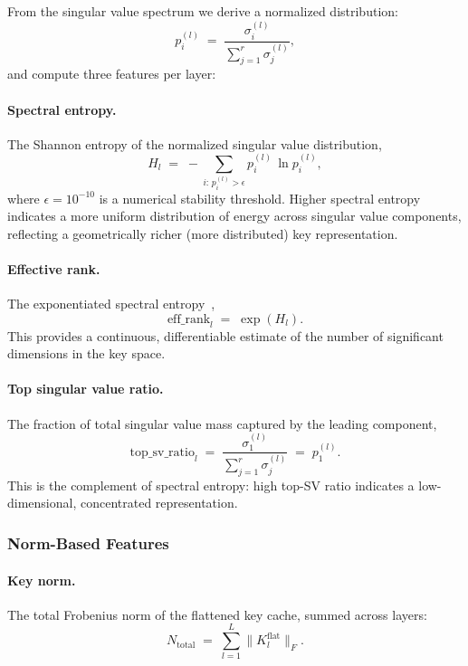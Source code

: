 From the singular value spectrum we derive a normalized distribution:
\begin{equation}
  p_i^{(l)} \;=\; \frac{\sigma_i^{(l)}}{\sum_{j=1}^{r} \sigma_j^{(l)}},
  \label{eq:pnorm}
\end{equation}
and compute three features per layer:

\paragraph{Spectral entropy.}
The Shannon entropy of the normalized singular value distribution,
\begin{equation}
  H_l \;=\; -\sum_{i:\, p_i^{(l)} > \epsilon} p_i^{(l)} \,\ln p_i^{(l)},
  \label{eq:spectral-entropy}
\end{equation}
where $\epsilon = 10^{-10}$ is a numerical stability threshold.
Higher spectral entropy indicates a more uniform distribution of energy across singular value components, reflecting a geometrically richer (more distributed) key representation.

\paragraph{Effective rank.}
The exponentiated spectral entropy~\cite{roy2007effective},
\begin{equation}
  \mathrm{eff\_rank}_l \;=\; \exp(H_l).
  \label{eq:eff-rank}
\end{equation}
This provides a continuous, differentiable estimate of the number of significant dimensions in the key space.

\paragraph{Top singular value ratio.}
The fraction of total singular value mass captured by the leading component,
\begin{equation}
  \mathrm{top\_sv\_ratio}_l \;=\; \frac{\sigma_1^{(l)}}{\sum_{j=1}^{r} \sigma_j^{(l)}} \;=\; p_1^{(l)}.
  \label{eq:top-sv}
\end{equation}
This is the complement of spectral entropy: high top-SV ratio indicates a low-dimensional, concentrated representation.

\subsubsection{Norm-Based Features}

\paragraph{Key norm.}
The total Frobenius norm of the flattened key cache, summed across layers:
\begin{equation}
  N_{\mathrm{total}} \;=\; \sum_{l=1}^{L} \bigl\lVert K_l^{\mathrm{flat}} \bigr\rVert_F.
  \label{eq:key-norm}
\end{equation}

